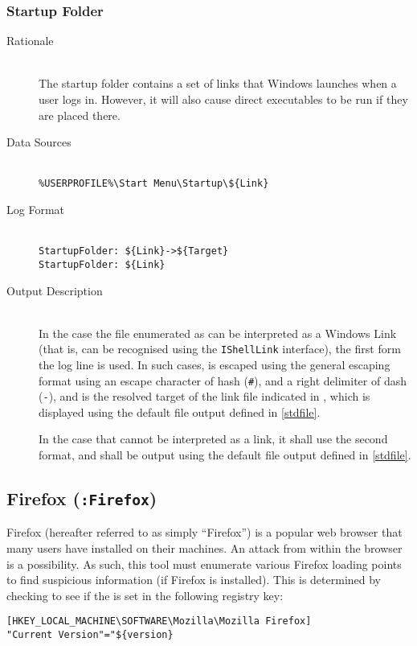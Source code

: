 \subsubsection{Startup Folder}
\begin{description}
\item[Rationale] \hfill \\
The startup folder contains a set of links that Windows launches when a user
logs in. However, it will also cause direct executables to be run if they are
placed there.
\item[Data Sources] \hfill \\
\verb|%USERPROFILE%\Start Menu\Startup\${Link}|
\item[Log Format] \hfill \\
\verb|StartupFolder: ${Link}->${Target}| \\
\verb|StartupFolder: ${Link}|
\item[Output Description] \hfill \\
In the case the file enumerated as  can be interpreted as a Windows
Link (that is, can be recognised using the \verb|IShellLink| interface), the
first form the log line is used. In such cases,  is escaped using the
general escaping format using an escape character of hash (\verb|#|), and a
right delimiter of dash (\verb|-|), and  is the resolved target of
the link file indicated in , which is displayed using the default file
output defined in \ref{stdfile}.

In the case that  cannot be interpreted as a link, it shall use the
second format, and  shall be output using the default file output
defined in \ref{stdfile}.
\end{description}

\subsection{Firefox (\texttt{:Firefox})}
Firefox (hereafter referred to as simply ``Firefox'') is a popular web
browser that many users have installed on their machines.  An attack from within
the browser is a possibility.  As such, this tool must enumerate various Firefox
loading points to find suspicious information (if Firefox is installed).  This
is determined by checking to see if the  is set in the following
registry key:
\begin{verbatim}
[HKEY_LOCAL_MACHINE\SOFTWARE\Mozilla\Mozilla Firefox] 
"Current Version"="${version}
\end{verbatim}

